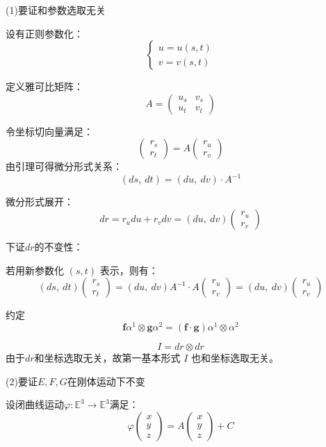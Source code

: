 \documentclass[lang=cn,10pt,thmcnt=section]{elegantbook}
\renewcommand{\vec}[1]{\mathbf{#1}}
\begin{document}
(1)要证和参数选取无关

设有正则参数化：
\[
\begin{cases} 
u = u(s, t) \\ 
v = v(s, t)
\end{cases}
\]

定义雅可比矩阵：
\[
A = \begin{pmatrix}
u_s & v_s \\ 
u_t & v_t
\end{pmatrix}
\]

令坐标切向量满足：
\[
\begin{pmatrix}
r_s \\ 
r_t
\end{pmatrix} = 
A \begin{pmatrix}
r_u \\ 
r_v
\end{pmatrix}
\]
由引理可得微分形式关系：
\[
(ds,\ dt) = (du,\ dv) \cdot A^{-1}
\]

微分形式展开：
\[
dr = r _u du + r _v dv = (du,\ dv) \begin{pmatrix} r _u \\ r _v \end{pmatrix}
\]

下证$dr$的不变性：

若用新参数化 $(s,t)$ 表示，则有：
\[
(ds,\ dt) \begin{pmatrix} r _s \\ r_t \end{pmatrix} 
= (du,\ dv) A^{-1} \cdot A \begin{pmatrix} r_u \\ r_v \end{pmatrix} 
= (du,\ dv) \begin{pmatrix} r_u \\ r_v \end{pmatrix}
\]

约定
$$
\vec{f} \alpha^1\otimes \vec{g} \alpha^{2} = (\vec{f} \cdot \vec{g})\alpha^1\otimes \alpha^{2}
$$

\[
I = dr \otimes dr
\]
由于$dr$和坐标选取无关，故第一基本形式 $I$ 也和坐标选取无关。

(2)要证$E,F,G$在刚体运动下不变

设闭曲线运动\(\varphi: \mathbb{E}^3 \to \mathbb{E}^3\)满足：
\[
\varphi\begin{pmatrix}x\\ y \\ z \end{pmatrix} = A \begin{pmatrix}x\\ y \\ z \end{pmatrix} + C
\]
\end{document}
